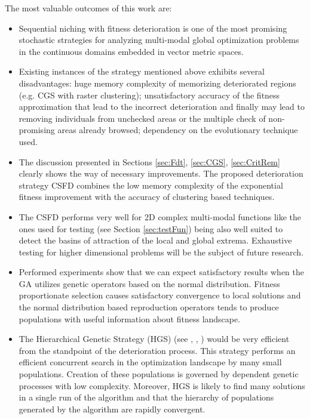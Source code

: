 The most valuable outcomes of this work are:
\begin{itemize}

\item
Sequential niching with fitness deterioration is one of the 
most promising stochastic strategies
for analyzing multi-modal global optimization problems in the continuous
domains embedded in vector metric spaces.

\item
Existing instances of the strategy mentioned above
exhibits several disadvantages: 
huge memory complexity of memorizing deteriorated regions
(e.g. CGS with raster clustering); 
unsatisfactory accuracy of the fitness approximation 
that lead to the incorrect deterioration and finally may lead to removing
individuals from unchecked areas or the multiple check of non-promising areas
already browsed; 
dependency on the evolutionary technique used.

\item
The discussion presented in Sections \ref{sec:Fdt}, \ref{sec:CGS}, \ref{sec:CritRem}
clearly shows the way of necessary improvements.
The proposed deterioration strategy CSFD combines the low memory complexity
of the exponential fitness improvement with the accuracy of
clustering based techniques.

\item
The CSFD performs very well for 2D complex multi-modal functions like the ones
used for testing (see Section \ref{sec:testFun}) being also well suited to detect
the basins of attraction of the local and global extrema.
Exhaustive testing for higher dimensional problems will be the subject
of future research.

\item
Performed experiments show that we can expect satisfactory results 
when the GA utilizes
genetic operators based on the normal distribution. 
Fitness proportionate selection causes satisfactory 
convergence to local solutions 
and the normal distribution based reproduction operators tends 
to produce populations with useful information about fitness landscape.

\item
The Hierarchical Genetic Strategy (HGS)
(see \cite{SchaeferKolodziej2003},
\cite{SchaeferAdamskaTelega2004},
\citep{WierzbaSemczukKolodziejSchaefer2003})
would be very efficient 
from the standpoint of the deterioration process.
This strategy performs an efficient concurrent
search in the optimization landscape by many small populations. Creation of
these populations is governed by dependent genetic processes with low complexity.
Moreover, HGS is likely to find many solutions in a
single run of the algorithm and that the hierarchy of populations generated
by the algorithm are rapidly convergent. 



\end{itemize}
